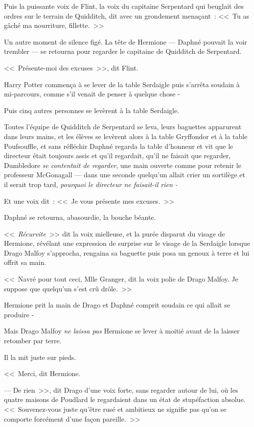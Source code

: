 Puis la puissante voix de Flint, la voix du capitaine Serpentard qui beuglait des ordres sur le terrain de Quidditch, dit avec un grondement menaçant~: <<~Tu as gâché ma nourriture, fillette.~>>

Un autre moment de silence figé. La tête de Hermione — Daphné pouvait la voir trembler — se retourna pour regarder le capitaine de Quidditch de Serpentard.

<<~Présente-moi des excuses~>>, dit Flint.

Harry Potter commença à se lever de la table Serdaigle puis s'arrêta soudain à mi-parcours, comme s'il venait de penser à quelque chose -

Puis cinq autres personnes se levèrent à la table Serdaigle.

Toutes l'équipe de Quidditch de Serpentard se leva, leurs baguettes apparurent dans leurs mains, et les élèves se levèrent alors à la table Gryffondor et à la table Poufsouffle, et sans réfléchir Daphné regarda la table d'honneur et vit que le directeur était toujours assis et qu'il regardait, qu'il ne faisait que regarder, Dumbledore \emph{se contentait de regarder}, une main ouverte comme pour retenir le professeur McGonagall — dans une seconde quelqu'un allait crier un sortilège et il serait trop tard, \emph{pourquoi le directeur ne faisait-il rien -}

Et une voix dit~: <<~Je vous présente mes excuses.~>>

Daphné se retourna, abasourdie, la bouche béante.

<<~\emph{Récurvite}~>> dit la voix mielleuse, et la purée disparut du visage de Hermione, révélant une expression de surprise sur le visage de la Serdaigle lorsque Drago Malfoy s'approcha, rengaina sa baguette puis posa un genoux à terre et lui offrit sa main.

<<~Navré pour tout ceci, Mlle Granger, dit la voix polie de Drago Malfoy. Je suppose que quelqu'un s'est crû drôle.~>>

Hermione prit la main de Drago et Daphné comprit soudain ce qui allait se produire -

Mais Drago Malfoy \emph{ne laissa pas} Hermione se lever à moitié avant de la laisser retomber par terre.

Il la mit juste sur pieds.

<<~Merci, dit Hermione.

--- De rien~>>, dit Drago d'une voix forte, sans regarder autour de lui, où les quatre maisons de Poudlard le regardaient dans un état de stupéfaction absolue. <<~Souvenez-vous juste qu'être rusé et ambitieux ne signifie pas qu'on se comporte forcément d'une façon pareille.~>>

